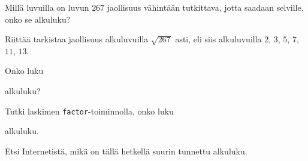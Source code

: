 \begin{kotitehtavasivu}
\begin{tehtava}
\end{tehtava}

\begin{tehtava}
    Millä luvuilla on luvun $267$ jaollisuus vähintään tutkittava, jotta saadaan selville, onko se alkuluku?
    
    \begin{vastaus}
        Riittää tarkistaa jaollisuus alkuluvuilla $\sqrt{267}$ asti, eli siis alkuluvuilla $2$, $3$, $5$, $7$, $11$, $13$.
    \end{vastaus}
    
\end{tehtava}

\begin{tehtava}
    Onko luku
    \begin{alakohdat}
    \end{alakohdat}
    alkuluku?
    
    \begin{vastaus}
        \begin{alakohdat}
        \end{alakohdat}
    \end{vastaus}
    
\end{tehtava}

\begin{tehtava}
    Tutki laskimen {\tt factor}-toiminnolla, onko luku
    \begin{alakohdat}
    \end{alakohdat}
    alkuluku.

    \begin{vastaus}
        \begin{alakohdat}
        \end{alakohdat}
    \end{vastaus}
    
\end{tehtava}

\begin{tehtava}
    Etsi Internetistä, mikä on tällä hetkellä suurin tunnettu alkuluku.
\end{tehtava}


\end{kotitehtavasivu}
